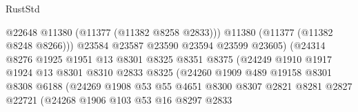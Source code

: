 \begin{lexlean}{RustStd}
\begin{coremodule}
                                          @22648
                                          @11380
                                          (@11377 (@11382 @8258 @2833)))
                                        @11380
                                        (@11377 (@11382 @8248 @8266)))
                                      @23584
                                      @23587
                                      @23590
                                      @23594
                                      @23599
                                      @23605)
                                    (@24314
                                      @8276
                                      @1925
                                      @1951
                                      @13
                                      @8301
                                      @8325
                                      @8351
                                      @8375
                                      (@24249
                                        @1910
                                        @1917
                                        @1924
                                        @13
                                        @8301
                                        @8310
                                        @2833
                                        @8325
                                        (@24260
                                          @1909
                                          @489
                                          @19158
                                          @8301
                                          @8308
                                          @6188
                                          (@24269
                                            @1908
                                            @53
                                            @55
                                            @4651
                                            @8300
                                            @8307
                                            @2821
                                            @8281
                                            @2827
                                            @22721
                                            (@24268
                                              @1906
                                              @103
                                              @53
                                              @16
                                              @8297
                                              @2833

\end{coremodule}
\end{lexlean}
